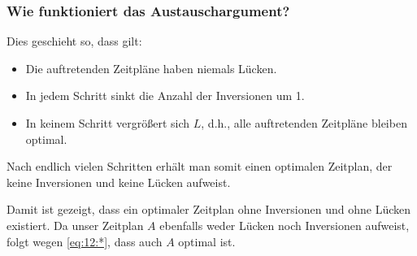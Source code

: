 \documentclass[smaller]{beamer}
\begin{document}
\begin{frame}
 \frametitle{Wie funktioniert das Austauschargument?}
 Dies geschieht so, dass gilt:
\begin{itemize}
\item Die auftretenden Zeitpläne haben niemals Lücken.
\item In jedem Schritt sinkt die Anzahl der Inversionen um 1.
\item In keinem Schritt vergrößert sich $L$, d.h., alle auftretenden Zeitpläne bleiben optimal.
\end{itemize}

Nach endlich vielen Schritten erhält man somit einen optimalen Zeitplan, der keine Inversionen und keine Lücken aufweist. \\ \vspace*{0.2cm}

Damit ist gezeigt, dass ein optimaler Zeitplan ohne Inversionen und ohne Lücken existiert. \alert{Da unser Zeitplan $A$ ebenfalls weder Lücken noch Inversionen aufweist, folgt wegen \eqref{eq:12:*}, dass auch $A$ optimal ist.}
\end{frame}
\end{document}
